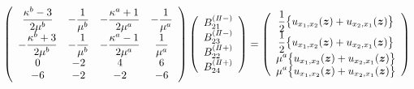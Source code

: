 \begin{align}
	\left(
	\begin{array}{cccc}
		{\displaystyle\frac{ \kappa^b-3}{2\mu^{b}}}& {\displaystyle-\frac{1}{\mu^{b}}} &
		{\displaystyle-\frac{\kappa^a+1}{2\mu^{a}}} & {\displaystyle-\frac{1}{\mu^{a}}} \\
		{\displaystyle-\frac{\kappa^b+3}{2\mu^{b}}} & {\displaystyle-\frac{1}{\mu^{b}}} &
		{\displaystyle-\frac{\kappa^a-1}{2\mu^{a}}} & {\displaystyle\frac{1}{\mu^{a}}} \\
		0 & -2 & 4 & 6 \\
		-6 & -2 & -2 & -6\\
	\end{array}
	\right)
	\left(
	\begin{array}{c}
		B_{21}^{(I\hspace{-.15em}I-)} \\
	 	B_{23}^{(I\hspace{-.15em}I-)} \\
		B_{22}^{(I\hspace{-.15em}I+)}\\
	 	B_{24}^{(I\hspace{-.15em}I+)} \\
	\end{array}
	\right)
	=
	\left(
	\begin{array}{c}
		{\displaystyle\frac{1}{2}\bigl\{u_{x_{1},x_{2}}(\bm{z})+u_{x_{2},x_{1}}(\bm{z})\bigr\}} \\
	 	{\displaystyle\frac{1}{2}\bigl\{u_{x_{1},x_{2}}(\bm{z})+u_{x_{2},x_{1}}(\bm{z})\bigr\}} \\
		{\displaystyle\mu^a\bigl\{u_{x_{1},x_{2}}(\bm{z})+u_{x_{2},x_{1}}(\bm{z})\bigr\}} \\
	 	{\displaystyle\mu^a \bigl\{u_{x_{1},x_{2}}(\bm{z})+u_{x_{2},x_{1}}(\bm{z})\bigr\}} \\
	\end{array}
	\right)
\end{align}

